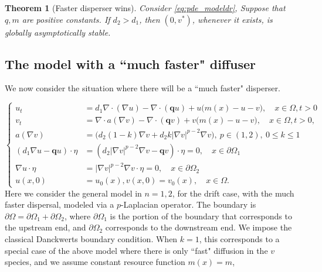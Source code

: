 \documentclass[10pt]{amsart}
\theoremstyle{plain}
\newtheorem{theorem}{Theorem}[section]
\theoremstyle{definition}
\begin{document}
    \begin{theorem}[Faster disperser wins]
    \label{thm:clde}
Consider \eqref{eq:pde_modeldr}, Suppose that $q, m$ are positive constants. If $d_2 > d_1$, then $( 0,v^{*})$, whenever it exists, is globally asymptotically stable.
    \end{theorem}


\subsection{The model with a ``much faster" diffuser}

We now consider the situation where there will be a ``much faster" disperser.



\begin{equation}
\label{eq:pde_modeld2-k}
\left\{ \begin{array}{ll}
u_t &= d_1 \nabla \cdot (\nabla u) - \nabla\cdot (\textbf{q}  u)+  u\Big(m(x)-u-v\Big), \quad x\in \Omega, t>0\\		v_t &= \nabla \cdot a(\nabla v)  - \nabla\cdot (\textbf{q}  v) + v\Big(m(x)-u-v\Big), \quad x\in\Omega,t>0, \\
	 a(\nabla v) & = \Big( d_2 (1-k)\nabla v  + d_2 k  |\nabla v|^{p-2}  \nabla v \Big) , \ p \in (1,2), \ 0 \leq k \leq 1 \\
 (d_{1}\nabla u - \textbf{q} u)  \cdot \eta &= (d_2   |\nabla v|^{p-2}  \nabla v - \textbf{q} v)  \cdot \eta =0, \quad x\in \partial \Omega_{1} \\
 \nabla u \cdot \eta &= |\nabla v|^{p-2} \nabla v \cdot \eta=0, \quad x\in \partial \Omega_{2} \\
		u(x,0)&=u_0(x), v(x,0)=v_{0} (x), \quad x\in \Omega.
\end{array}\right.
\end{equation}
%
Here we consider the general model in $n=1,2$, for the drift case, with the much faster dispersal, modeled via a $p$-Laplacian operator. The boundary is $\partial \Omega = \partial \Omega_{1} + \partial \Omega_{2}$, where $\partial \Omega_{1}$ is the portion of the boundary that corresponds to the upstream end, and $\partial \Omega_{2}$ corresponds to the downstream end. We impose the classical Danckwerts boundary condition.
When $k=1$, this corresponds to a special case of the above model where there is only ``fast" diffusion in the $v$ species, and we assume constant resource function $m(x) = m$,
\end{document}
